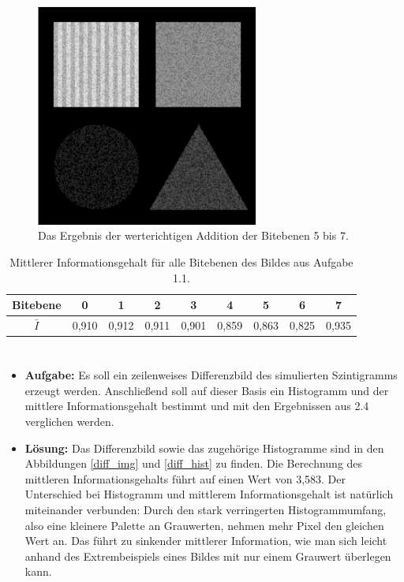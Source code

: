 \documentclass[12pt, a4paper, twoside]{report}
\begin{document}
\begin{figure}[h]
\centering
\includegraphics[width=0.65\textwidth]{../bilder/bitebenen_3.png}
\caption{Das Ergebnis der werterichtigen Addition der Bitebenen 5 bis 7.}
\label{bitlayer_3}
\end{figure}

\begin{table}
\centering
\begin{tabular}{c|c|c|c|c|c|c|c|c}
Bitebene & 0 & 1 & 2 & 3 & 4 & 5 & 6 & 7 \\ 
\hline 
$\bar{I}$ & 0,910  & 0,912 & 0,911 & 0,901 & 0,859 & 0,863 & 0,825 & 0,935 \\ 
\end{tabular}
\caption{Mittlerer Informationsgehalt für alle Bitebenen des Bildes aus Aufgabe 1.1.}
\label{bit_mean_info}
\end{table}

\section{}
\begin{itemize}
\item \textbf{Aufgabe:} Es soll ein zeilenweises Differenzbild des simulierten Szintigramms erzeugt werden. Anschließend soll auf dieser Basis ein Histogramm und der mittlere Informationsgehalt bestimmt und mit den Ergebnissen aus 2.4 verglichen werden.
\item \textbf{Lösung:} Das Differenzbild sowie das zugehörige Histogramme sind in den Abbildungen \ref{diff_img} und \ref{diff_hist} zu finden. Die Berechnung des mittleren Informationsgehalts führt auf einen Wert von 3,583. Der Unterschied bei Histogramm und mittlerem Informationsgehalt ist natürlich miteinander verbunden: Durch den stark verringerten Histogrammumfang, also eine kleinere Palette an Grauwerten, nehmen mehr Pixel den gleichen Wert an. Das führt zu sinkender mittlerer Information, wie man sich leicht anhand des Extrembeispiels eines Bildes mit nur einem Grauwert überlegen kann.
\end{itemize}
\end{document}
